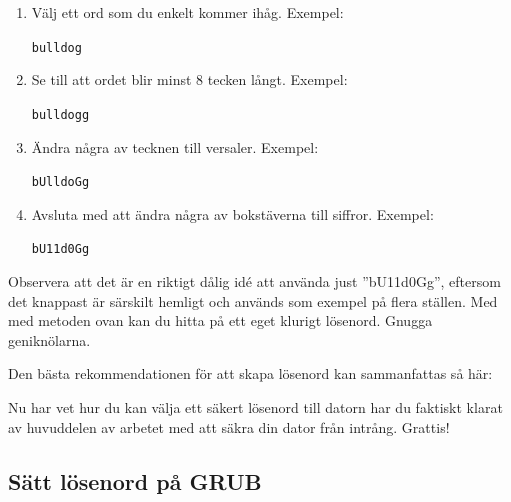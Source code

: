 \documentclass[a4paper,final]{memoir} %
\begin{document}
\begin{enumerate}

\item Välj ett ord som du enkelt kommer ihåg. Exempel:

\texttt{bulldog}

\item Se till att ordet blir minst 8 tecken långt. Exempel:

\texttt{bulldogg}

\item Ändra några av tecknen till versaler. Exempel:

\texttt{bUlldoGg}

\item Avsluta med att ändra några av bokstäverna till siffror. Exempel:

\texttt{bU11d0Gg}

\end{enumerate}

Observera att det är en riktigt dålig idé att använda just ''bU11d0Gg'', eftersom det knappast är särskilt hemligt och används som exempel på flera ställen. Med med metoden ovan kan du hitta på ett eget klurigt lösenord. Gnugga geniknölarna.

Den bästa rekommendationen för att skapa lösenord kan sammanfattas så här:


Nu har vet hur du kan välja ett säkert lösenord till datorn har du faktiskt klarat av huvuddelen av arbetet med att säkra din dator från intrång. Grattis!



\subsection{Sätt lösenord på GRUB}

\end{document}

